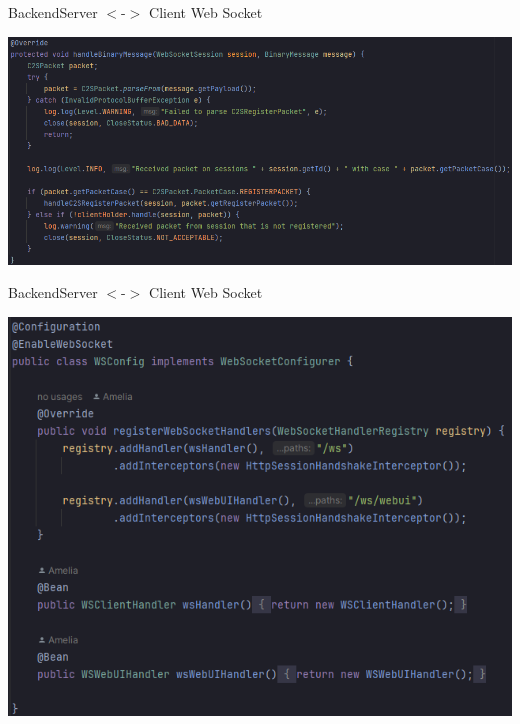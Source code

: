 \documentclass{beamer}
\begin{document}
\begin{frame}{Backend}{Server $<$-$>$ Client Web Socket}

\includegraphics[width=\linewidth,keepaspectratio]{code_snippet.png}

\end{frame}

\begin{frame}{Backend}{Server $<$-$>$ Client Web Socket}

\includegraphics[width=\linewidth,keepaspectratio,height=0.7\textwidth]{code_snippet_2.png}

\end{frame}
\end{document}

